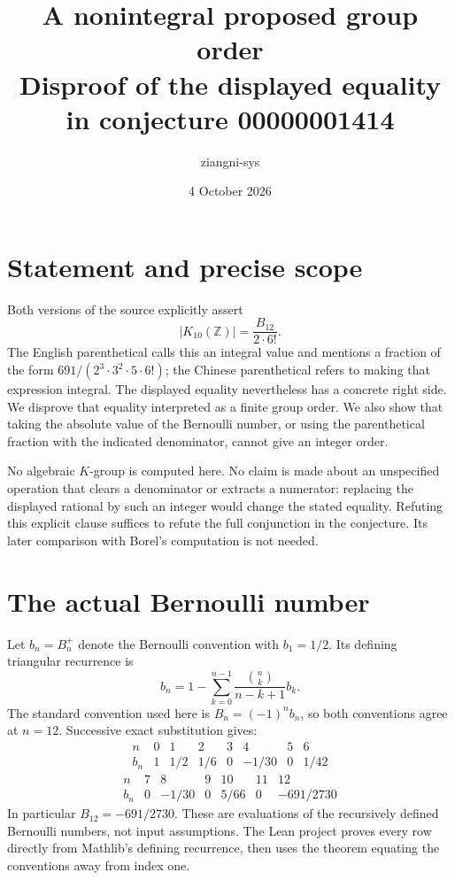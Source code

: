 \documentclass[11pt,a4paper]{article}
\title{A nonintegral proposed group order\\Disproof of the displayed equality in conjecture 00000001414}
\author{ziangni-sys}
\date{4 October 2026}
\begin{document}
\maketitle
\section*{Statement and precise scope}
Both versions of the source explicitly assert
\[
 |K_{10}(\mathbb Z)|=\frac{B_{12}}{2\cdot6!}.
\]
The English parenthetical calls this an integral value and mentions a fraction of the form $691/(2^3\cdot3^2\cdot5\cdot6!)$; the Chinese parenthetical refers to making that expression integral. The displayed equality nevertheless has a concrete right side. We disprove that equality interpreted as a finite group order. We also show that taking the absolute value of the Bernoulli number, or using the parenthetical fraction with the indicated denominator, cannot give an integer order.

No algebraic $K$-group is computed here. No claim is made about an unspecified operation that clears a denominator or extracts a numerator: replacing the displayed rational by such an integer would change the stated equality. Refuting this explicit clause suffices to refute the full conjunction in the conjecture. Its later comparison with Borel's computation is not needed.

\section*{The actual Bernoulli number}
Let $b_n=B_n^+$ denote the Bernoulli convention with $b_1=1/2$. Its defining triangular recurrence is
\[
 b_n=1-\sum_{k=0}^{n-1}\frac{\binom nk}{n-k+1}b_k.
\]
The standard convention used here is $B_n=(-1)^nb_n$, so both conventions agree at $n=12$. Successive exact substitution gives:
\[
\begin{array}{c|rrrrrrr}
n&0&1&2&3&4&5&6\\\hline
b_n&1&1/2&1/6&0&-1/30&0&1/42
\end{array}
\]
\[
\begin{array}{c|rrrrrr}
n&7&8&9&10&11&12\\\hline
b_n&0&-1/30&0&5/66&0&-691/2730
\end{array}
\]
In particular $B_{12}=-691/2730$. These are evaluations of the recursively defined Bernoulli numbers, not input assumptions. The Lean project proves every row directly from Mathlib's defining recurrence, then uses the theorem equating the conventions away from index one.
\end{document}
